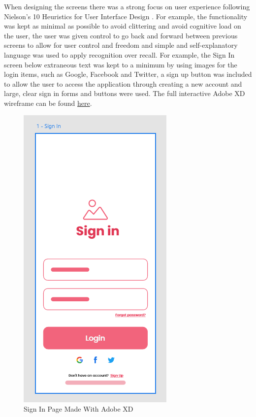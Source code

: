 \documentclass[12pt]{article}
\begin{document}
	When designing the screens there was a strong focus on user experience following Nielson's 10 Heuristics for User Interface Design \cite{experience10UsabilityHeuristics} . For example, the functionality was kept as minimal as possible to avoid clittering and avoid cognitive load on the user, the user was given control to go back and forward between previous screens to allow for user control and freedom and simple and self-explanatory language was used to apply recognition over recall. For example, the Sign In screen below extraneous text was kept to a minimum by using images for the login items, such as Google, Facebook and Twitter, a sign up button was included to allow the user to access the application through creating a new account and large, clear sign in forms and buttons were used. The full interactive Adobe XD wireframe can be found \href{https://xd.adobe.com/view/c6aeda9c-9b9a-456a-b699-cc4cd8b4cefa-93fd/}{here}. 
	
	\begin{figure}[H]
		\centering
		\includegraphics[scale=0.85]{images/sign-in.png}
		\caption{Sign In Page Made With Adobe XD}
		\label{fig:sign-in}
	\end{figure}
	
\end{document}
